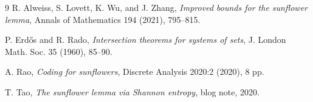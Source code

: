 \documentclass[11pt]{article}
\theoremstyle{remark}
\begin{document}
\begin{thebibliography}{9}
R. Alweiss, S. Lovett, K. Wu, and J. Zhang, \emph{Improved bounds for the sunflower lemma}, Annals of Mathematics 194 (2021), 795--815.

P. Erd\H{o}s and R. Rado, \emph{Intersection theorems for systems of sets}, J. London Math. Soc. 35 (1960), 85--90.

A. Rao, \emph{Coding for sunflowers}, Discrete Analysis 2020:2 (2020), 8 pp.

T. Tao, \emph{The sunflower lemma via Shannon entropy}, blog note, 2020.
\end{thebibliography}
\end{document}
